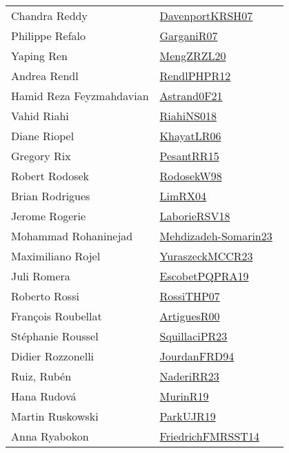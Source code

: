 {\begin{longtable}{p{4cm}p{20cm}}
Chandra Reddy & \href{works/DavenportKRSH07.pdf}{DavenportKRSH07}~\cite{DavenportKRSH07}\\
Philippe Refalo & \href{works/GarganiR07.pdf}{GarganiR07}~\cite{GarganiR07}\\
Yaping Ren & \href{works/MengZRZL20.pdf}{MengZRZL20}~\cite{MengZRZL20}\\
Andrea Rendl & \href{works/RendlPHPR12.pdf}{RendlPHPR12}~\cite{RendlPHPR12}\\
Hamid Reza Feyzmahdavian & \href{works/Astrand0F21.pdf}{Astrand0F21}~\cite{Astrand0F21}\\
Vahid Riahi & \href{works/RiahiNS018.pdf}{RiahiNS018}~\cite{RiahiNS018}\\
Diane Riopel & \href{works/KhayatLR06.pdf}{KhayatLR06}~\cite{KhayatLR06}\\
Gregory Rix & \href{works/PesantRR15.pdf}{PesantRR15}~\cite{PesantRR15}\\
Robert Rodosek & \href{works/RodosekW98.pdf}{RodosekW98}~\cite{RodosekW98}\\
Brian Rodrigues & \href{works/LimRX04.pdf}{LimRX04}~\cite{LimRX04}\\
Jerome Rogerie & \href{works/LaborieRSV18.pdf}{LaborieRSV18}~\cite{LaborieRSV18}\\
Mohammad Rohaninejad & \href{works/Mehdizadeh-Somarin23.pdf}{Mehdizadeh-Somarin23}~\cite{Mehdizadeh-Somarin23}\\
Maximiliano Rojel & \href{works/YuraszeckMCCR23.pdf}{YuraszeckMCCR23}~\cite{YuraszeckMCCR23}\\
Juli Romera & \href{works/EscobetPQPRA19.pdf}{EscobetPQPRA19}~\cite{EscobetPQPRA19}\\
Roberto Rossi & \href{works/RossiTHP07.pdf}{RossiTHP07}~\cite{RossiTHP07}\\
Fran{\c{c}}ois Roubellat & \href{works/ArtiguesR00.pdf}{ArtiguesR00}~\cite{ArtiguesR00}\\
St{\'{e}}phanie Roussel & \href{works/SquillaciPR23.pdf}{SquillaciPR23}~\cite{SquillaciPR23}\\
Didier Rozzonelli & \href{}{JourdanFRD94}~\cite{JourdanFRD94}\\
Ruiz, Rub\'{e}n & \href{works/NaderiRR23.pdf}{NaderiRR23}~\cite{NaderiRR23}\\
Hana Rudov{\'{a}} & \href{works/MurinR19.pdf}{MurinR19}~\cite{MurinR19}\\
Martin Ruskowski & \href{works/ParkUJR19.pdf}{ParkUJR19}~\cite{ParkUJR19}\\
Anna Ryabokon & \href{}{FriedrichFMRSST14}~\cite{FriedrichFMRSST14}\\

\end{longtable}}
